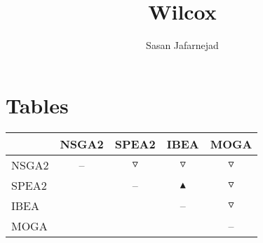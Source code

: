 \documentclass{article}
\title{Wilcox}
\author{Sasan Jafarnejad}
\begin{document}
 \maketitle
 \section{Tables}
 \begin{table}
 \centering \begin{tabular}{l c c c c }
  \hline & NSGA2 & SPEA2 & IBEA & MOGA \\
 \hline  NSGA2 &  --  & $\triangledown$ & $\triangledown$ & $\triangledown$ \\
  SPEA2 &   &  --  & $\blacktriangle$ & $\triangledown$ \\
  IBEA &   &   &  --  & $\triangledown$ \\
  MOGA &   &   &   &  --  \\
 \hline
 \end{tabular}
 \end{table}
 
\end{document}
